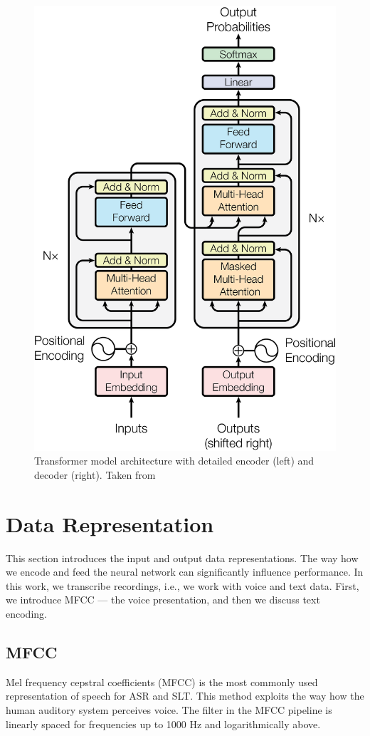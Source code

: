 \begin{figure}[]
	\centering
	\includegraphics[width=0.8\linewidth]{img/ModalNet-21.png}
	\caption{Transformer model architecture with detailed encoder (left) and decoder (right). Taken from }
	\label{fig:transformer}
\end{figure}





\pagebreak
\section{Data Representation}
This section introduces the input and output data representations. The way how we encode and feed the neural network can significantly influence performance. In this work, we transcribe recordings, i.e., we work with voice and text data. First, we introduce MFCC --- the voice presentation, and then we discuss text encoding.

\subsection{MFCC}
\label{mfcc}
Mel frequency cepstral coefficients (MFCC) is the most commonly used representation of speech for ASR and SLT. 
This method exploits the way how the human auditory system perceives voice. The filter in the MFCC pipeline is linearly spaced for frequencies up to 1000 Hz and logarithmically above. 

